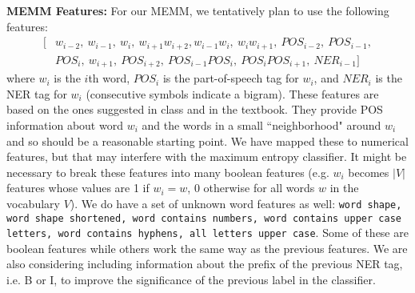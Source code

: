 \documentclass[12pt]{article}
\begin{document}
\textbf{MEMM Features:}
For our MEMM, we tentatively plan to use the following features:
\begin{equation*}
\begin{split}
[&w_{i - 2},\ w_{i - 1},\ w_i,\ w_{i + 1}w_{i + 2}, 
w_{i - 1}w_i,\ w_iw_{i + 1},\ POS_{i - 2},\ POS_{i - 1},\\ &POS_i,\ w_{i + 1},\ POS_{i + 2}, \ POS_{i - 1}POS_i,\ POS_iPOS_{i + 1},\ NER_{i - 1}]
\end{split}
\end{equation*}
where $w_i$ is the $i$th word, $POS_i$ is the part-of-speech tag for $w_i$, and $NER_i$ is the NER tag for $w_i$ (consecutive symbols indicate a bigram). These features are based on the ones suggested in class and in the textbook. They provide POS information about word $w_i$ and the words in a small ``neighborhood" around $w_i$ and so should be a reasonable starting point. We have mapped these to numerical features, but that may interfere with the maximum entropy classifier. It might be necessary to break these features into many boolean features (e.g. $w_i$ becomes $|V|$ features whose values are 1 if $w_i = w$, 0 otherwise for all words $w$ in the vocabulary $V$). We do have a set of unknown word features as well:
{\tt word shape, word shape shortened, word contains numbers, word contains upper case letters, word contains hyphens, all letters upper case}. Some of these are boolean features while others work the same way as the previous features. We are also considering including information about the prefix of the previous NER tag, i.e. B or I, to improve the significance of the previous label in the classifier.
   
\end{document}
